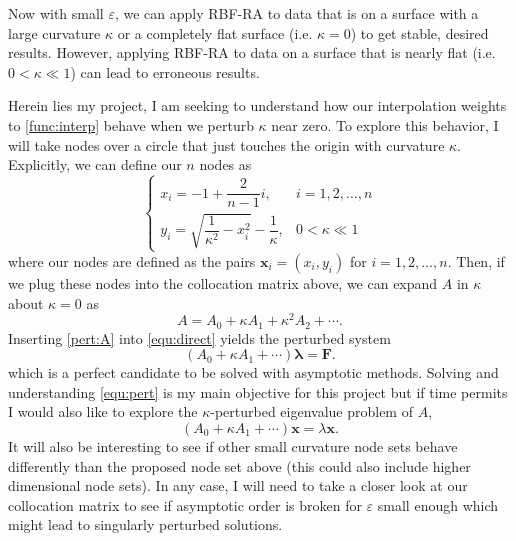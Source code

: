 \documentclass[a4paper,11pt]{article}
\newcommand{\eps}{\varepsilon}
\begin{document}
Now with small $ \eps $, we can apply RBF-RA to data that is on a surface with a large curvature $ \kappa $ or a completely flat surface (i.e. $ \kappa = 0 $) to get stable, desired results. However, applying RBF-RA to data on a surface that is nearly flat (i.e. $ 0 < \kappa \ll 1 $) can lead to erroneous results. 

Herein lies my project, I am seeking to understand how our interpolation weights to \eqref{func:interp} behave when we perturb $ \kappa $ near zero. To explore this behavior, I will take nodes over a circle that just touches the origin with curvature $ \kappa $. Explicitly, we can define our $ n $ nodes as
\[
	\begin{cases}
		x_i = -1 + \dfrac{2}{n - 1} i, & i = 1, 2, \ldots, n \\
		y_i = \sqrt{\dfrac{1}{\kappa^2} - x_i^2} - \dfrac{1}{\kappa}, & 0 < \kappa \ll 1
	\end{cases}
\]
where our nodes are defined as the pairs $ \mathbf{x}_i = (x_i, y_i) $ for $ i = 1, 2, \ldots, n $. Then, if we plug these nodes into the collocation matrix above, we can expand $ A $ in $ \kappa $ about $ \kappa = 0 $ as
\begin{equation}
	A = A_0 + \kappa A_1 + \kappa^2 A_2 + \cdots. \label{pert:A}
\end{equation}
Inserting \eqref{pert:A} into \eqref{equ:direct} yields the perturbed system
\begin{equation}
	(A_0 + \kappa A_1 + \cdots) \pmb{\lambda} = \mathbf{F}. \label{equ:pert}
\end{equation}
which is a perfect candidate to be solved with asymptotic methods. Solving and understanding \eqref{equ:pert} is my main objective for this project but if time permits I would also like to explore the $ \kappa $-perturbed eigenvalue problem of $ A $,
\[
		(A_0 + \kappa A_1 + \cdots) \mathbf{x} = \lambda \mathbf{x}.
\]
 It will also be interesting to see if other small curvature node sets behave differently than the proposed node set above (this could also include higher dimensional node sets). In any case, I will need to take a closer look at our collocation matrix to see if asymptotic order is broken for $ \eps $ small enough which might lead to singularly perturbed solutions.
\end{document}
